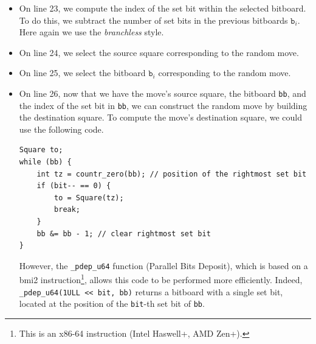 \documentclass[12pt,a4paper,twoside,openright]{book}
\begin{document}
\begin{itemize}
\item On line 23, we compute the index of the set bit within the selected bitboard. To do this, we subtract the number of set bits in the previous bitboards ${\texttt b}_i$. Here again we use the \emph{branchless} style.
\item On line 24, we select the source square corresponding to the random move.
\item On line 25, we select the bitboard ${\texttt b}_i$ corresponding to the random move.
\item On line 26, now that we have the move's source square, the bitboard \texttt{bb}, and the index of the set bit in \texttt{bb}, we can construct the random move by building the destination square. To compute the move's destination square, we could use the following code.
\begin{verbatim}
Square to;
while (bb) {
    int tz = countr_zero(bb); // position of the rightmost set bit
    if (bit-- == 0) {
        to = Square(tz);
        break;
    }
    bb &= bb - 1; // clear rightmost set bit
}
\end{verbatim}
However, the \texttt{_pdep_u64} function (Parallel Bits Deposit), which is based on a \gls{bmi2} instruction\footnote{This is an x86-64 instruction (Intel Haswell+, AMD Zen+).}, allows this code to be performed more efficiently. Indeed, \texttt{_pdep_u64(1ULL << bit, bb)} returns a bitboard with a single set bit, located at the position of the \texttt{bit}-th set bit of \texttt{bb}.

\end{itemize}
\end{document}
